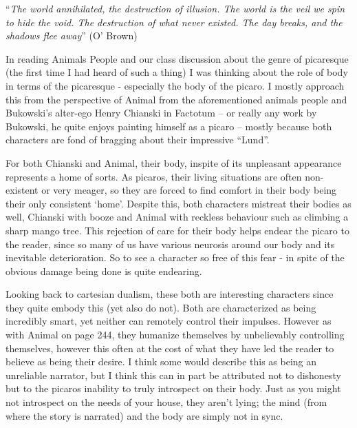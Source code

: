 
``\textit{The world annihilated, the destruction of illusion. The world is the veil we spin to hide the void. The destruction of what never existed. The day breaks, and the shadows flee away}'' (O' Brown)

In reading Animals People and our class discussion about the genre of picaresque (the first time I had heard of such a thing) I was thinking about the role of body in terms of the picaresque - especially the body of the picaro. I mostly approach this from the perspective of Animal from the aforementioned animals people and Bukowski's alter-ego Henry Chianski in Factotum -- or really any work by Bukowski, he quite enjoys painting himself as a picaro -- mostly because both characters are fond of bragging about their impressive ``Lund''. 

For both Chianski and Animal, their body, inspite of its unpleasant appearance represents a home of sorts. As picaros, their living situations are often non-existent or very meager, so they are forced to find comfort in their body being their only consistent `home'. Despite this, both characters mistreat their bodies as well, Chianski with booze and Animal with reckless behaviour such as climbing a sharp mango tree. This rejection of care for their body helps endear the picaro to the reader, since so many of us have various neurosis around our body and its inevitable deterioration. So to see a character so free of this fear - in spite of the obvious damage being done is quite endearing. 

Looking back to cartesian dualism, these both are interesting characters since they quite embody this (yet also do not). Both are characterized as being incredibly smart, yet neither can remotely control their impulses. However as with Animal on page 244, they humanize themselves by unbelievably controlling themselves, however this often at the cost of what they have led the reader to believe as being their desire. I think some would describe this as being an unreliable narrator, but I think this can in part be attributed not to dishonesty but to the picaros inability to truly introspect on their body. Just as you might not introspect on the needs of your house, they aren't lying; the mind (from where the story is narrated) and the body are simply not in sync. 

